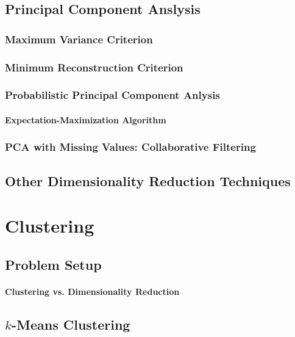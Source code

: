\documentclass{report}
\begin{document}
\subsection{Principal Component Anslysis}

\subsubsection{Maximum Variance Criterion}

\subsubsection{Minimum Reconstruction Criterion}

\subsubsection{Probabilistic Principal Component Anlysis}

\paragraph{Expectation-Maximization Algorithm}

\subsubsection{PCA with Missing Values: Collaborative Filtering}

\subsection{Other Dimensionality Reduction Techniques}


\section{Clustering}
\label{sec:cluster}

\subsection{Problem Setup}

\paragraph{Clustering vs. Dimensionality Reduction}

\subsection{$k$-Means Clustering}
\end{document}
